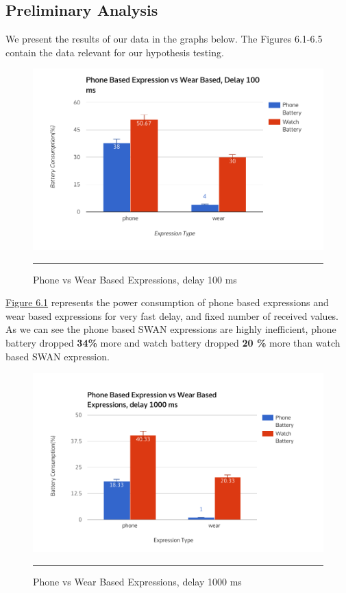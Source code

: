 \subsection{Preliminary Analysis}

We present the results of our data in the graphs below.
The Figures 6.1-6.5 contain the data relevant for our hypothesis testing.
 
 \begin{figure}[htbp]
  \centering
    \includegraphics[scale=0.8]{Figures/phone_vs_wear_100.pdf}
    \rule{35em}{0.5pt}
  \caption[Phone vs Wear Based Expressions, delay 100 ms]{Phone vs Wear Based Expressions, delay 100 ms}
  \label{fig:phone_vs_wear_100}
\end{figure}

\hyperref[fig:phone_vs_wear_100]{Figure 6.1} represents the power consumption of phone based expressions and wear based expressions for very fast delay,
and fixed number of received values. As we can see the phone based SWAN expressions are highly inefficient, phone battery dropped \textbf{34\%} more and watch battery dropped 
\textbf{20 \% } more than watch based SWAN expression. 

 \begin{figure}[htbp]
  \centering
    \includegraphics[scale=0.8]{Figures/phone_vs_wear_1000.pdf}
    \rule{35em}{0.5pt}
  \caption[Phone vs Wear Based  Expressions, delay 1000 ms]{Phone vs Wear Based  Expressions, delay 1000 ms}
  \label{fig:phone_vs_wear_1000}
\end{figure}


